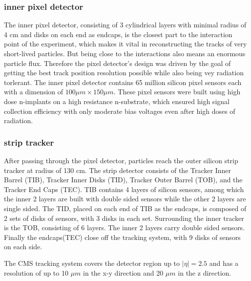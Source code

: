 \subsubsection{inner pixel detector}
The inner pixel detector, consisting of 3 cylindrical layers with minimal radius of 4 cm and disks on each end as endcaps, is the closest part to the interaction point of the experiment, which makes it vital in reconstructing the tracks of very short-lived particles. But being close to the interactions also means an enormous particle flux. Therefore the pixel detector's design was driven by the goal of getting the best track position resolution possible while also being vey radiation torlerant. The inner pixel detector contains 65 million silicon pixel sensors each with a dimension of $100\mu m \times 150\mu m$. These pixel sensors were built using high dose n-implants on a high resistance n-substrate, which ensured high signal collection efficiency with only moderate bias voltages even after high doses of radiation.
\subsubsection{strip tracker}
After passing through the pixel detector, particles reach the outer silicon strip tracker at radius of 130 cm. The strip detector consists of the Tracker Inner Barrel (TIB), Tracker Inner Disks (TID), Tracker Outer Barrel (TOB), and the Tracker End Caps (TEC). TIB contains 4 layers of silicon sensors, among which the inner 2 layers are built with double sided sensors while the other 2 layers are single sided. The TID, placed on each end of TIB as the endcaps, is composed of 2 sets of disks of sensors, with 3 disks in each set. Surrounding the inner tracker is the TOB, consisting of 6 layers. The inner 2 layers carry double sided sensors. Finally the endcaps(TEC) close off the tracking system, with 9 disks of sensors on each side. 

\vspace{0.3cm}
The CMS tracking system covers the detector region up to $|\eta| = 2.5$ and has a resolution of up to 10 $\mu m$ in the x-y direction and 20 $\mu m$ in the z direction. 
